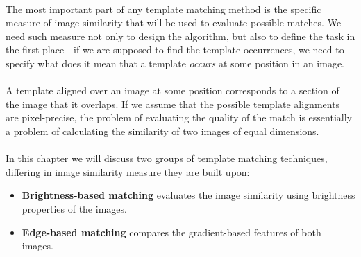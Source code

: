 \paragraph*{}
The most important part of any template matching method is the specific measure of image similarity that will be used to evaluate possible matches. We need such measure not only to design the algorithm, but also to define the task in the first place - if we are supposed to find the template occurrences, we need to specify what does it mean that a template \textit{occurs} at some position in an image. 

\paragraph*{}
A template aligned over an image at some position corresponds to a section of the image that it overlaps. If we assume that the possible template alignments are pixel-precise, the problem of evaluating the quality of the match is essentially a problem of calculating the similarity of two images of equal dimensions.

\paragraph*{}
In this chapter we will discuss two groups of template matching techniques, differing in image similarity measure they are built upon:

\begin{itemize}
	\item \textbf{Brightness-based matching} evaluates the image similarity using brightness properties of the images.
	\item \textbf{Edge-based matching} compares the gradient-based features of both images.
\end{itemize}
